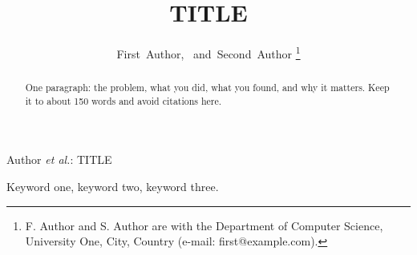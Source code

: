 \documentclass[journal]{IEEEtran}
\begin{document}
\title{{{TITLE}}}

\author{First~Author,~
        and~Second~Author%
\thanks{F. Author and S. Author are with the Department of Computer Science, University One, City, Country (e-mail: first@example.com).}}

%
{Author \MakeLowercase{\textit{et al.}}: {{TITLE}}}

\maketitle

\begin{abstract}
One paragraph: the problem, what you did, what you found, and why it matters. Keep it to about 150 words and avoid citations here.
\end{abstract}

\begin{IEEEkeywords}
Keyword one, keyword two, keyword three.
\end{IEEEkeywords}






\end{document}
